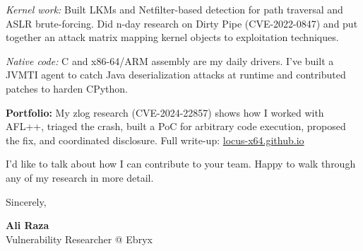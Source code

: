 \documentclass[a4paper,11pt]{article}
\begin{document}
\vspace{1mm}
\textit{Kernel work:} Built LKMs and Netfilter-based detection for path traversal and ASLR brute-forcing. Did n-day research on Dirty Pipe (CVE-2022-0847) and put together an attack matrix mapping kernel objects to exploitation techniques.

\vspace{1mm}
\textit{Native code:} C and x86-64/ARM assembly are my daily drivers. I've built a JVMTI agent to catch Java deserialization attacks at runtime and contributed patches to harden CPython.

\vspace{3mm}

\textbf{Portfolio:} My zlog research (CVE-2024-22857) shows how I worked with AFL++, triaged the crash, built a PoC for arbitrary code execution, proposed the fix, and coordinated disclosure. Full write-up: \href{https://locus-x64.github.io/writeups/2024/03/09/cve-2023-22857.html}{locus-x64.github.io}

\vspace{3mm}

I'd like to talk about how I can contribute to your team. Happy to walk through any of my research in more detail.

\vspace{5mm}

\noindent
Sincerely,

\vspace{8mm}

\noindent
\textbf{Ali Raza}\\
Vulnerability Researcher @ Ebryx
\end{document}
